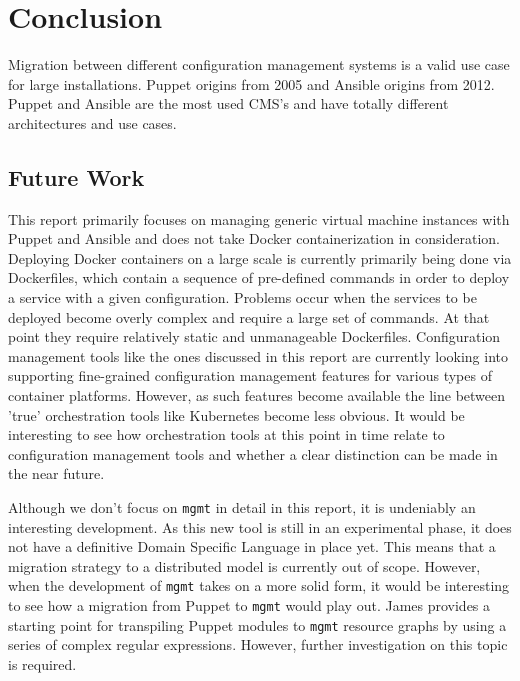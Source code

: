 \section{Conclusion}\label{sec:conclusion}
Migration between different configuration management systems is a valid use case for large installations. Puppet origins from 2005 and Ansible origins from 2012. Puppet and Ansible are the most used CMS's and have totally different architectures and use cases. 

\subsection{Future Work}\label{subsec:futurework}
This report primarily focuses on managing generic virtual machine instances with Puppet and Ansible and does not take Docker containerization in consideration. Deploying Docker containers on a large scale is currently primarily being done via Dockerfiles, which contain a sequence of pre-defined commands in order to deploy a service with a given configuration. Problems occur when the services to be deployed become overly complex and require a large set of commands. At that point they require relatively static and unmanageable Dockerfiles. Configuration management tools like the ones discussed in this report are currently looking into supporting fine-grained configuration management features for various types of container platforms. However, as such features become available the line between 'true' orchestration tools like Kubernetes \cite{kubernetes_2016} become less obvious. It would be interesting to see how orchestration tools at this point in time relate to configuration management tools and whether a clear distinction can be made in the near future.

Although we don't focus on \texttt{mgmt} in detail in this report, it is undeniably an interesting development. As this new tool is still in an experimental phase, it does not have a definitive Domain Specific Language in place yet. This means that a migration strategy to a distributed model is currently out of scope. However, when the development of \texttt{mgmt} takes on a more solid form, it would be interesting to see how a migration from Puppet to \texttt{mgmt} would play out. James \cite{frank_2016} provides a starting point for transpiling Puppet modules to \texttt{mgmt} resource graphs by using a series of complex regular expressions. However, further investigation on this topic is required.
